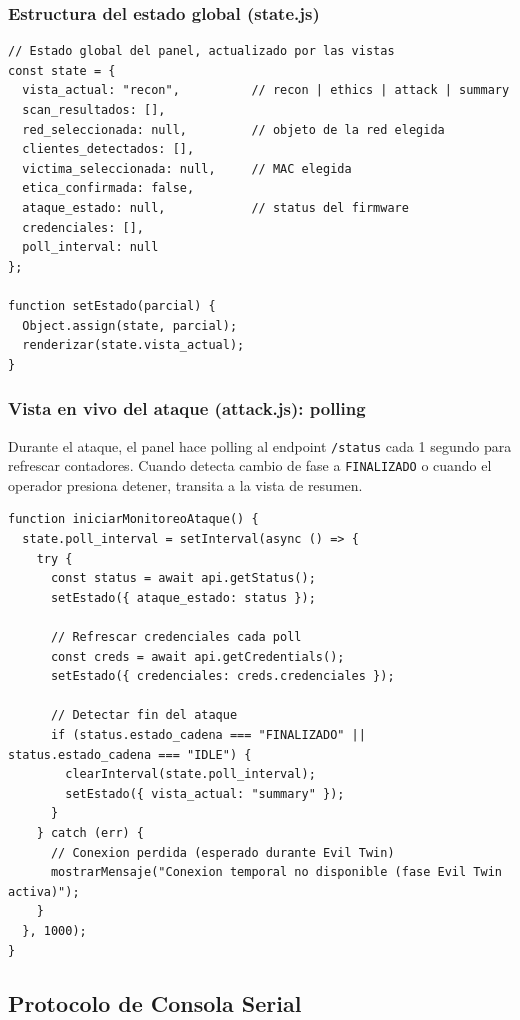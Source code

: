 \documentclass[11pt,a4paper]{article}
\begin{document}
\subsubsection{Estructura del estado global (state.js)}

\begin{lstlisting}
// Estado global del panel, actualizado por las vistas
const state = {
  vista_actual: "recon",          // recon | ethics | attack | summary
  scan_resultados: [],
  red_seleccionada: null,         // objeto de la red elegida
  clientes_detectados: [],
  victima_seleccionada: null,     // MAC elegida
  etica_confirmada: false,
  ataque_estado: null,            // status del firmware
  credenciales: [],
  poll_interval: null
};

function setEstado(parcial) {
  Object.assign(state, parcial);
  renderizar(state.vista_actual);
}
\end{lstlisting}

\subsubsection{Vista en vivo del ataque (attack.js): polling}

Durante el ataque, el panel hace polling al endpoint \texttt{/status}
cada 1 segundo para refrescar contadores. Cuando detecta cambio de
fase a \texttt{FINALIZADO} o cuando el operador presiona detener,
transita a la vista de resumen.

\begin{lstlisting}
function iniciarMonitoreoAtaque() {
  state.poll_interval = setInterval(async () => {
    try {
      const status = await api.getStatus();
      setEstado({ ataque_estado: status });

      // Refrescar credenciales cada poll
      const creds = await api.getCredentials();
      setEstado({ credenciales: creds.credenciales });

      // Detectar fin del ataque
      if (status.estado_cadena === "FINALIZADO" || status.estado_cadena === "IDLE") {
        clearInterval(state.poll_interval);
        setEstado({ vista_actual: "summary" });
      }
    } catch (err) {
      // Conexion perdida (esperado durante Evil Twin)
      mostrarMensaje("Conexion temporal no disponible (fase Evil Twin activa)");
    }
  }, 1000);
}
\end{lstlisting}

\subsection{Protocolo de Consola Serial}
\end{document}
